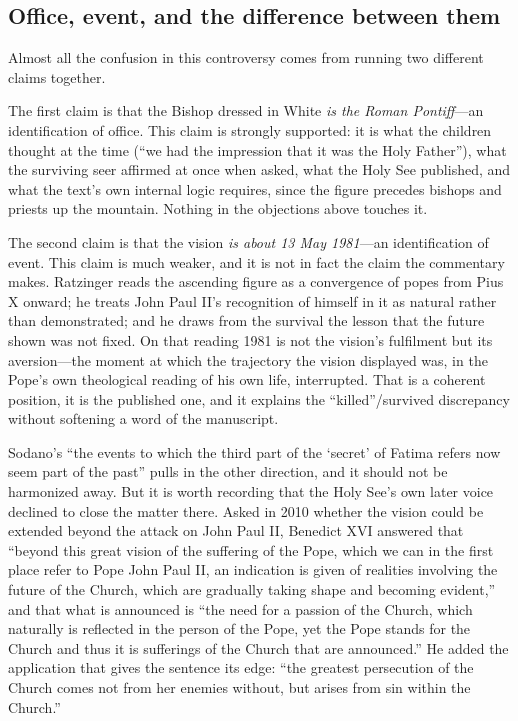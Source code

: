 \subsection{Office, event, and the difference between them}

Almost all the confusion in this controversy comes from running two
different claims together.

The first claim is that the Bishop dressed in White \emph{is the
Roman Pontiff}---an identification of office. This claim is strongly
supported: it is what the children thought at the time (``we had the
impression that it was the Holy Father''), what the surviving seer
affirmed at once when asked, what the Holy See published, and what
the text's own internal logic requires, since the figure precedes
bishops and priests up the mountain. Nothing in the objections above
touches it.

The second claim is that the vision \emph{is about 13 May 1981}---an
identification of event. This claim is much weaker, and it is not in
fact the claim the commentary makes. Ratzinger reads the ascending
figure as a convergence of popes from Pius X onward; he treats
John Paul II's recognition of himself in it as natural rather than
demonstrated; and he draws from the survival the lesson that the
future shown was not fixed. On that reading 1981 is not the vision's
fulfilment but its aversion---the moment at which the trajectory the
vision displayed was, in the Pope's own theological reading of his
own life, interrupted. That is a coherent position, it is the
published one, and it explains the ``killed''\slash survived
discrepancy without softening a word of the manuscript.

Sodano's ``the events to which the third part of the `secret' of
Fatima refers now seem part of the past'' pulls in the other
direction, and it should not be harmonized away. But it is worth
recording that the Holy See's own later voice declined to close the
matter there. Asked in 2010 whether the vision could be extended
beyond the attack on John Paul II, Benedict XVI answered that
``beyond this great vision of the suffering of the Pope, which we can
in the first place refer to Pope John Paul II, an indication is given
of realities involving the future of the Church, which are gradually
taking shape and becoming evident,'' and that what is announced is
``the need for a passion of the Church, which naturally is reflected
in the person of the Pope, yet the Pope stands for the Church and
thus it is sufferings of the Church that are announced.'' He added
the application that gives the sentence its edge: ``the greatest
persecution of the Church comes not from her enemies without, but
arises from sin within the Church.''

